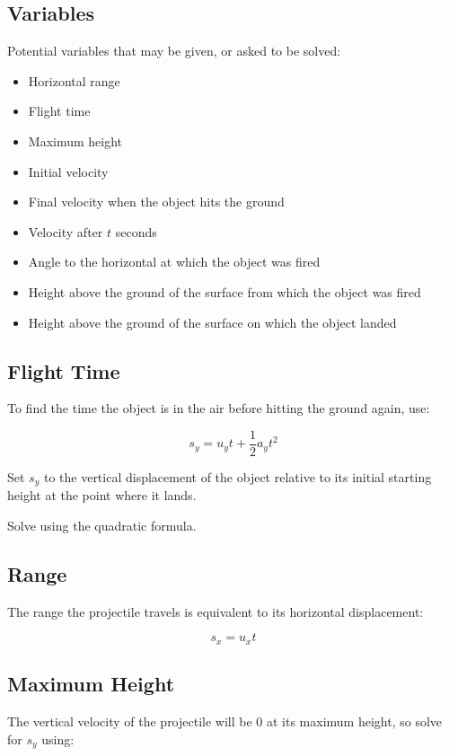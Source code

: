\documentclass[a4paper,11pt]{article}
\begin{document}
\subsection{Variables}

Potential variables that may be given, or asked to be solved:

\begin{itemize}
\item Horizontal range
\item Flight time
\item Maximum height
\item Initial velocity
\item Final velocity when the object hits the ground
\item Velocity after $t$ seconds
\item Angle to the horizontal at which the object was fired
\item Height above the ground of the surface from which the object was fired
\item Height above the ground of the surface on which the object landed
\end{itemize}


\subsection{Flight Time}

To find the time the object is in the air before hitting the ground again, use:

$$
s_y = u_y t + \frac{1}{2} a_y t^2
$$

Set $s_y$ to the vertical displacement of the object relative to its initial
starting height at the point where it lands.

Solve using the quadratic formula.


\subsection{Range}

The range the projectile travels is equivalent to its horizontal displacement:

$$
s_x = u_x t
$$


\subsection{Maximum Height}

The vertical velocity of the projectile will be 0 at its maximum height, so
solve for $s_y$ using:
\end{document}
